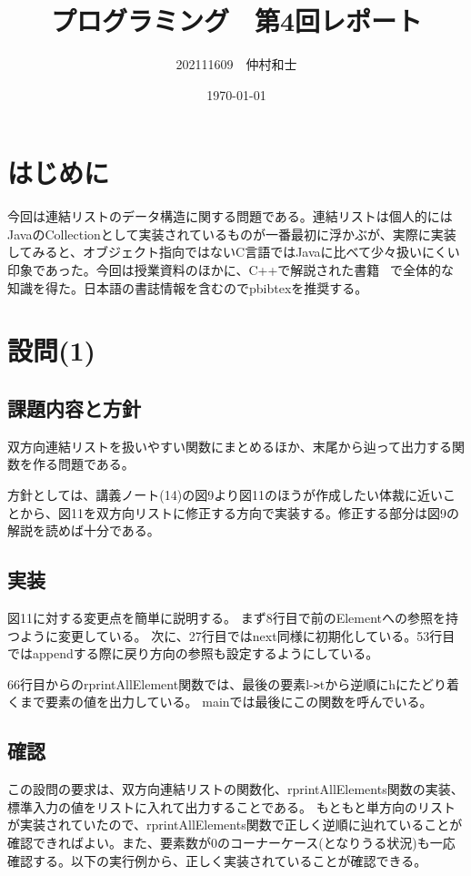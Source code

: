 \documentclass[dvipdfmx,12pt,a4j]{jarticle}
\title{プログラミング　第4回レポート}
\author{202111609　仲村和士}
\date{\today}
\begin{document}
\maketitle
\section{はじめに}
今回は連結リストのデータ構造に関する問題である。連結リストは個人的にはJavaのCollectionとして実装されているものが一番最初に浮かぶが、実際に実装してみると、オブジェクト指向ではないC言語ではJavaに比べて少々扱いにくい印象であった。今回は授業資料のほかに、C++で解説された書籍~\cite{algorithm} で全体的な知識を得た。日本語の書誌情報を含むのでpbibtexを推奨する。

\section{設問(1)}
\subsection{課題内容と方針}
双方向連結リストを扱いやすい関数にまとめるほか、末尾から辿って出力する関数を作る問題である。

方針としては、講義ノート(14)の図9より図11のほうが作成したい体裁に近いことから、図11を双方向リストに修正する方向で実装する。修正する部分は図9の解説を読めば十分である。

\subsection{実装}
図11に対する変更点を簡単に説明する。
まず8行目で前のElementへの参照を持つように変更している。
次に、27行目ではnext同様に初期化している。53行目ではappendする際に戻り方向の参照も設定するようにしている。

66行目からのrprintAllElement関数では、最後の要素l-\verb+>+tから逆順にhにたどり着くまで要素の値を出力している。
mainでは最後にこの関数を呼んでいる。



\subsection{確認}
この設問の要求は、双方向連結リストの関数化、rprintAllElements関数の実装、標準入力の値をリストに入れて出力することである。
もともと単方向のリストが実装されていたので、rprintAllElements関数で正しく逆順に辿れていることが確認できればよい。また、要素数が0のコーナーケース(となりうる状況)も一応確認する。以下の実行例から、正しく実装されていることが確認できる。
\end{document}
